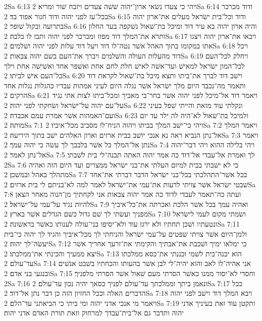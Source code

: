 2Sa 6:13  ויהי כי צעדו נשׂאי ארון־יהוה שׁשׁה צעדים ויזבח שׁור ומריא׃
2Sa 6:14  ודוד מכרכר בכל־עז לפני יהוה ודוד חגור אפוד בד׃
2Sa 6:15  ודוד וכל־בית ישׂראל מעלים את־ארון יהוה בתרועה ובקול שׁופר׃
2Sa 6:16  והיה ארון יהוה בא עיר דוד ומיכל בת־שׁאול נשׁקפה בעד החלון ותרא את־המלך דוד מפזז ומכרכר לפני יהוה ותבז לו בלבה׃
2Sa 6:17  ויבאו את־ארון יהוה ויצגו אתו במקומו בתוך האהל אשׁר נטה־לו דוד ויעל דוד עלות לפני יהוה ושׁלמים׃
2Sa 6:18  ויכל דוד מהעלות העולה והשׁלמים ויברך את־העם בשׁם יהוה צבאות׃
2Sa 6:19  ויחלק לכל־העם לכל־המון ישׂראל למאישׁ ועד־אשׁה לאישׁ חלת לחם אחת ואשׁפר אחד ואשׁישׁה אחת וילך כל־העם אישׁ לביתו׃
2Sa 6:20  וישׁב דוד לברך את־ביתו ותצא מיכל בת־שׁאול לקראת דוד ותאמר מה־נכבד היום מלך ישׂראל אשׁר נגלה היום לעיני אמהות עבדיו כהגלות נגלות אחד הרקים׃
2Sa 6:21  ויאמר דוד אל־מיכל לפני יהוה אשׁר בחר־בי מאביך ומכל־ביתו לצות אתי נגיד על־עם יהוה על־ישׂראל ושׂחקתי לפני יהוה׃
2Sa 6:22  ונקלתי עוד מזאת והייתי שׁפל בעיני ועם־האמהות אשׁר אמרת עמם אכבדה׃
2Sa 6:23  ולמיכל בת־שׁאול לא־היה לה ילד עד יום מותה׃
2Sa 7:1  ויהי כי־ישׁב המלך בביתו ויהוה הניח־לו מסביב מכל־איביו׃
2Sa 7:2  ויאמר המלך אל־נתן הנביא ראה נא אנכי יושׁב בבית ארזים וארון האלהים ישׁב בתוך היריעה׃
2Sa 7:3  ויאמר נתן אל־המלך כל אשׁר בלבבך לך עשׂה כי יהוה עמך׃
2Sa 7:4  ויהי בלילה ההוא ויהי דבר־יהוה אל־נתן לאמר׃
2Sa 7:5  לך ואמרת אל־עבדי אל־דוד כה אמר יהוה האתה תבנה־לי בית לשׁבתי׃
2Sa 7:6  כי לא ישׁבתי בבית למיום העלתי את־בני ישׂראל ממצרים ועד היום הזה ואהיה מתהלך באהל ובמשׁכן׃
2Sa 7:7  בכל אשׁר־התהלכתי בכל־בני ישׂראל הדבר דברתי את־אחד שׁבטי ישׂראל אשׁר צויתי לרעות את־עמי את־ישׂראל לאמר למה לא־בניתם לי בית ארזים׃
2Sa 7:8  ועתה כה־תאמר לעבדי לדוד כה אמר יהוה צבאות אני לקחתיך מן־הנוה מאחר הצאן להיות נגיד על־עמי על־ישׂראל׃
2Sa 7:9  ואהיה עמך בכל אשׁר הלכת ואכרתה את־כל־איביך מפניך ועשׂתי לך שׁם גדול כשׁם הגדלים אשׁר בארץ׃
2Sa 7:10  ושׂמתי מקום לעמי לישׂראל ונטעתיו ושׁכן תחתיו ולא ירגז עוד ולא־יסיפו בני־עולה לענותו כאשׁר בראשׁונה׃
2Sa 7:11  ולמן־היום אשׁר צויתי שׁפטים על־עמי ישׂראל והניחתי לך מכל־איביך והגיד לך יהוה כי־בית יעשׂה־לך יהוה׃
2Sa 7:12  כי ימלאו ימיך ושׁכבת את־אבתיך והקימתי את־זרעך אחריך אשׁר יצא ממעיך והכינתי את־ממלכתו׃
2Sa 7:13  הוא יבנה־בית לשׁמי וכננתי את־כסא ממלכתו עד־עולם׃
2Sa 7:14  אני אהיה־לו לאב והוא יהיה־לי לבן אשׁר בהעותו והכחתיו בשׁבט אנשׁים ובנגעי בני אדם׃
2Sa 7:15  וחסדי לא־יסור ממנו כאשׁר הסרתי מעם שׁאול אשׁר הסרתי מלפניך׃
2Sa 7:16  ונאמן ביתך וממלכתך עד־עולם לפניך כסאך יהיה נכון עד־עולם׃
2Sa 7:17  ככל הדברים האלה וככל החזיון הזה כן דבר נתן אל־דוד׃
2Sa 7:18  ויבא המלך דוד וישׁב לפני יהוה ויאמר מי אנכי אדני יהוה ומי ביתי כי הביאתני עד־הלם׃
2Sa 7:19  ותקטן עוד זאת בעיניך אדני יהוה ותדבר גם אל־בית־עבדך למרחוק וזאת תורת האדם אדני יהוה׃
